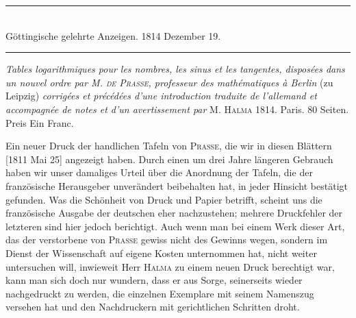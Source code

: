 \par{}
\begin{center}
\rule{0.63\linewidth}{0.3pt}\\
Göttingische gelehrte Anzeigen. 1814 Dezember 19.\\
\rule{0.63\linewidth}{0.3pt}
\end{center}

\emph{Tables logarithmiques pour les nombres, les sinus et les tangentes, disposées
dans un nouvel ordre par M. \textup{\textsc{de Prasse}}, professeur des mathématiques à Berlin} (zu
Leipzig) \emph{corrigées et précédées d’une introduction traduite de l’allemand et accompagnée de notes et d’un avertissement par} M. \textsc{Halma} 1814. Paris. 80 Seiten. Preis
Ein Franc.

Ein neuer Druck der handlichen Tafeln von \textsc{Prasse}, die wir in diesen Blättern [1811 Mai 25] angezeigt haben. Durch einen um drei Jahre längeren Gebrauch haben wir unser damaliges Urteil über die Anordnung der Tafeln, die der französische Herausgeber unverändert beibehalten hat, in jeder Hinsicht bestätigt gefunden. Was die Schönheit von Druck und Papier betrifft, scheint uns die französische Ausgabe der deutschen eher nachzustehen; mehrere Druckfehler der letzteren sind hier jedoch berichtigt. Auch wenn man bei einem Werk dieser Art, das der verstorbene von \textsc{Prasse} gewiss nicht des Gewinns wegen, sondern im Dienst der Wissenschaft auf eigene Kosten unternommen hat, nicht weiter untersuchen will, inwieweit Herr \textsc{Halma} zu einem neuen Druck berechtigt war, kann man sich doch nur wundern, dass er aus Sorge, seinerseits wieder nachgedruckt zu werden, die einzelnen Exemplare mit seinem Namenszug versehen hat und den Nachdruckern mit gerichtlichen Schritten droht.
